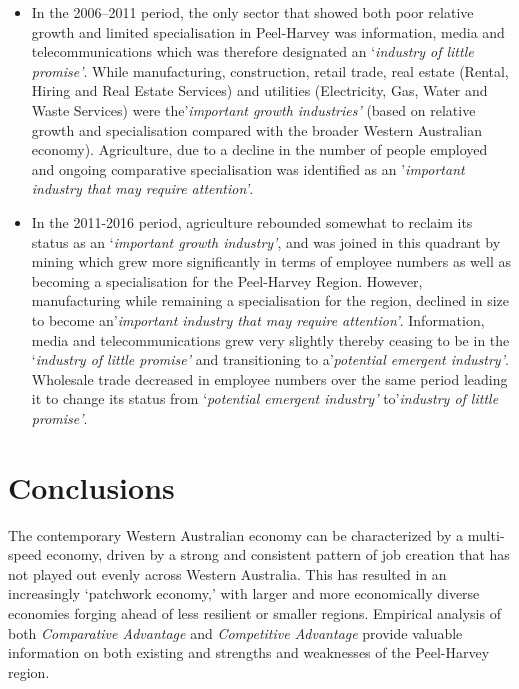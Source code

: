 \documentclass[
]{book}
\begin{document}
\begin{itemize}
\item
  In the 2006--2011 period, the only sector that showed both poor relative growth and limited specialisation in Peel-Harvey was information, media and telecommunications which was therefore designated an `\emph{industry of little promise'}. While manufacturing, construction, retail trade, real estate (Rental, Hiring and Real Estate Services) and utilities (Electricity, Gas, Water and Waste Services) were the'\emph{important growth industries'} (based on relative growth and specialisation compared with the broader Western Australian economy). Agriculture, due to a decline in the number of people employed and ongoing comparative specialisation was identified as an '\emph{important industry that may require attention'}.
\item
  In the 2011-2016 period, agriculture rebounded somewhat to reclaim its status as an `\emph{important growth industry'}, and was joined in this quadrant by mining which grew more significantly in terms of employee numbers as well as becoming a specialisation for the Peel-Harvey Region. However, manufacturing while remaining a specialisation for the region, declined in size to become an'\emph{important industry that may require attention'}. Information, media and telecommunications grew very slightly thereby ceasing to be in the `\emph{industry of little promise'} and transitioning to a'\emph{potential emergent industry'}. Wholesale trade decreased in employee numbers over the same period leading it to change its status from `\emph{potential emergent industry'} to'\emph{industry of little promise'}.
\end{itemize}

\hypertarget{conclusions-5}{%
\section{Conclusions}\label{conclusions-5}}

The contemporary Western Australian economy can be characterized by a multi-speed economy, driven by a strong and consistent pattern of job creation that has not played out evenly across Western Australia. This has resulted in an increasingly `patchwork economy,' with larger and more economically diverse economies forging ahead of less resilient or smaller regions. Empirical analysis of both \emph{Comparative Advantage} and \emph{Competitive Advantage} provide valuable information on both existing and strengths and weaknesses of the Peel-Harvey region.~
\end{document}
